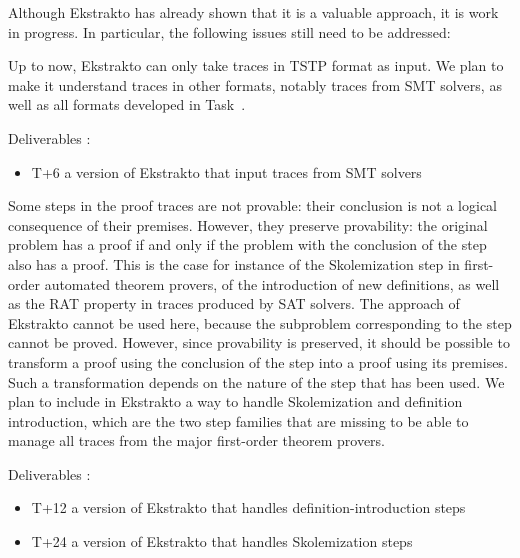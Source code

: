 \begin{workpackage}
\begin{tasklist}
\begin{task}[id=tracetodedukti, title=Translate ATP traces into Dedukti]
Although Ekstrakto has already shown that it is a
valuable approach, it is work in progress. In particular, the
following issues still need to be addressed:

\begin{compactenum}
\item Up to now, Ekstrakto can only take traces in TSTP format as input. We plan
  to make it understand traces in other formats, notably traces from SMT
  solvers, as well as all formats developed in
  Task~.

  Deliverables :
  \begin{itemize}
  \item T+6 a version of Ekstrakto that input traces from SMT solvers
  \end{itemize}


\item  Some steps in the proof traces are not provable: their conclusion is
  not a logical consequence of their premises. However, they preserve
  provability: the original problem has a proof if and only if the
  problem with the conclusion of the step also has a proof. This is the
  case for instance of the Skolemization step in first-order automated
  theorem provers, of the introduction of new definitions, as well as
  the RAT property in traces produced by SAT solvers. The approach of
  Ekstrakto cannot be used here, because the subproblem corresponding to
  the step cannot be proved. However, since provability is preserved, it
  should be possible to transform a
  proof using the conclusion of the step into a proof using its
  premises. Such a transformation depends on the nature of the step that
  has been used. We plan to include in Ekstrakto a way to handle
  Skolemization and definition introduction, which are the two step
  families that are missing to be able to manage all traces from the
  major first-order theorem provers.

  Deliverables :
  \begin{itemize}
  \item T+12 a version of Ekstrakto that handles definition-introduction steps
  \item T+24 a version of Ekstrakto that handles Skolemization steps
  \end{itemize}




\end{compactenum}
\end{task}
\end{tasklist}
\end{workpackage}
